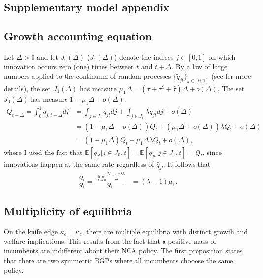 \documentclass[ecta,nameyear,draft]{econsocart}
\theoremstyle{plain}
\theoremstyle{remark}
\begin{document}
\begin{appendix} 


\section{Supplementary model appendix}\label{appendix:model_online}

\subsection{Growth accounting equation}\label{appendix:model:growth_accounting_equation}

Let $\Delta > 0$ and let $J_0(\Delta)$ ($J_1(\Delta)$) denote the indices $j\in [0,1]$ on which innovation occurs zero (one) times between $t$ and $t+\Delta$. By a law of large numbers applied to the continuum of random processes $\{\tilde{q}_{jt}\}_{j \in [0,1]}$ (see \cite{uhlig_law_1996} for more details), the set $J_1(\Delta)$ has measure $\mu_1 \Delta = (\tau + \tau^S + \hat{\tau})\Delta + o(\Delta)$. The set $J_0(\Delta)$ has measure $1 - \mu_1 \Delta + o(\Delta)$. 
\begin{align*}
	Q_{t+\Delta} = \int_0^1 \bar{q}_{j,t+\Delta} dj &= \int_{j \in J_0} \bar{q}_{jt} dj + \int_{j \in J_1} \lambda \bar{q}_{jt} dj + o(\Delta) \\
	&= (1 - \mu_1\Delta - o(\Delta)) Q_t + (\mu_1 \Delta + o(\Delta) ) \lambda Q_t + o(\Delta) \\
	&= (1 - \mu_1\Delta) Q_t + \mu_1\Delta \lambda Q_t + o(\Delta),
\end{align*}
where I used the fact that $\mathbb{E}[\bar{q}_{jt} | j \in J_0, t]  = \mathbb{E}[\bar{q}_{jt} | j \in J_1, t] = Q_t$, since innovations happen at the same rate regardless of $\bar{q}_{jt}$. It follows that
\begin{align*}
	\frac{\dot{Q}_t}{Q_t} = \frac{\lim_{\Delta \to 0} \frac{Q_{t+\Delta} - Q_t}{\Delta}}{Q_t} &= (\lambda - 1)\mu_1.
\end{align*}

\subsection{Multiplicity of equilibria}\label{appendix:model:multiplicity_of_equilibria}

On the knife edge $\kappa_c = \bar{\kappa}_c$, there are multiple equilibria with distinct growth and welfare implications. This results from the fact that a positive mass of incumbents are indifferent about their NCA policy. The first proposition states that there are two symmetric BGPs where all incumbents chooose the same policy.


\end{appendix}
\end{document}
